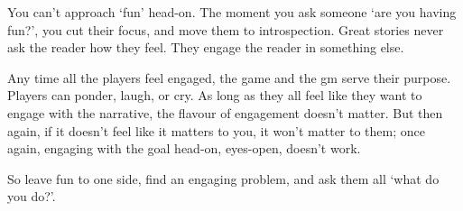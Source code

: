 \begin{multicols}{2}
You can't approach `fun' head-on.
The moment you ask someone `are you having fun?', you cut their focus, and move them to introspection.
Great stories never ask the reader how they feel.
They engage the reader in something else.

Any time all the players feel engaged, the game and the \gls{gm} serve their purpose.
Players can ponder, laugh, or cry.
As long as they all feel like they want to engage with the narrative, the flavour of engagement doesn't matter.
But then again, if it doesn't feel like it matters to you, it won't matter to them; once again, engaging with the goal head-on, eyes-open, doesn't work.

So leave fun to one side, find an engaging problem, and ask them all `what do you do?'.

\end{multicols}
